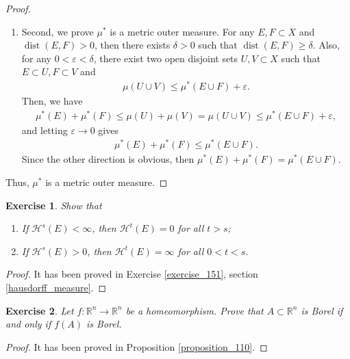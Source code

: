 \documentclass[11pt]{book}
\newtheorem{exercise}{Exercise}[section]
\theoremstyle{definition}
\numberwithin{equation}{chapter}
\def\H{{\mathcal H}}
\begin{document}
\begin{proof}
\begin{enumerate}[label=(\alph*)]
    \item Second, we prove $\mu^*$ is a metric outer measure. For any $E, F \subset X$ and $\operatorname{dist}(E,F) > 0$, then there exists $\delta > 0$ such that $\operatorname{dist}(E,F) \geq \delta$. Also, for any $0 < \varepsilon < \delta$, there exist two open disjoint sets $U, V \subset X$ such that $E \subset U, F \subset V$ and 
    \begin{align*}
        \mu(U \cup V) \leq \mu^*(E \cup F) + \varepsilon.
    \end{align*}
    Then, we have
    \begin{align*}
        \mu^*(E) + \mu^*(F) \leq \mu(U) + \mu(V) = \mu(U \cup V) \leq \mu^*(E \cup F) + \varepsilon,
    \end{align*}
    and letting $\varepsilon \to 0$ gives
    \begin{align*}
        \mu^*(E) + \mu^*(F) \leq \mu^*(E \cup F).
    \end{align*}
    Since the other direction is obvious, then $\mu^*(E) + \mu^*(F) = \mu^*(E \cup F)$.
\end{enumerate}
Thus, $\mu^*$ is a metric outer measure.
\end{proof}

\medskip

\begin{exercise}
Show that
\begin{enumerate}[label=(\alph*)]
    \item If $\H^s(E) < \infty$, then $\H^t(E) = 0$ for all $t > s$;
    \item If $\H^s(E) > 0$, then $\H^t(E) = \infty$ for all $0 < t < s$.
\end{enumerate}
\end{exercise}
\begin{proof}
It has been proved in Exercise \ref{exercise_151}, section \ref{hausdorff_measure}.
\end{proof}

\medskip

\begin{exercise}
Let $f:\mathbb{R}^n\to\mathbb{R}^n$ be a homeomorphism. Prove that $A\subset\mathbb{R}^n$ is Borel if and only if $f(A)$ is Borel.
\end{exercise}
\begin{proof}
It has been proved in Proposition \ref{proposition_110}.
\end{proof}

\medskip
\end{document}
